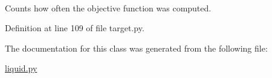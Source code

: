 \hypertarget{classforcebalance_1_1target_1_1Target_ad4cd0ab38d8fc97d3e7a6e22ce130a16}{
\paragraph[{xct}]{}}\label{classforcebalance_1_1target_1_1Target_ad4cd0ab38d8fc97d3e7a6e22ce130a16}


\-Counts how often the objective function was computed. 



\-Definition at line 109 of file target.\-py.



\-The documentation for this class was generated from the following file\-:\begin{DoxyCompactItemize}
\item 
\hyperlink{liquid_8py}{liquid.\-py}\end{DoxyCompactItemize}
